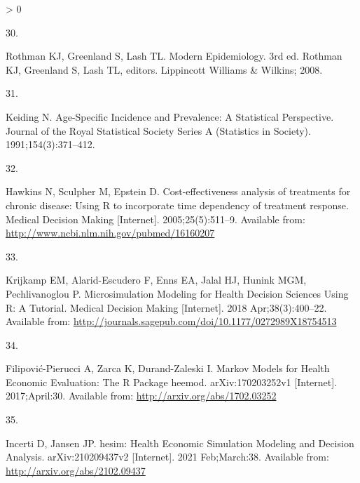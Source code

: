 \documentclass[
]{article}
\newlength{\cslhangindent}
\newlength{\csllabelwidth}
\newenvironment{CSLReferences}[2] %
 {%
  \setlength{\parindent}{0pt}
  \ifodd #1 \everypar{\setlength{\hangindent}{\cslhangindent}}\ignorespaces\fi
  \ifnum #2 > 0
  \setlength{\parskip}{#2\baselineskip}
  \fi
 }%
 {}
\newcommand{\CSLLeftMargin}[1]{\parbox[t]{\csllabelwidth}{#1}}
\newcommand{\CSLRightInline}[1]{\parbox[t]{\linewidth - \csllabelwidth}{#1}\break}
\begin{document}
\begin{CSLReferences}{0}{0}
\leavevmode\hypertarget{ref-Rothman2008h}{}%
\CSLLeftMargin{30. }
\CSLRightInline{Rothman KJ, Greenland S, Lash TL. {Modern Epidemiology}. 3rd ed. Rothman KJ, Greenland S, Lash TL, editors. Lippincott Williams {\&} Wilkins; 2008. }

\leavevmode\hypertarget{ref-Keiding1991}{}%
\CSLLeftMargin{31. }
\CSLRightInline{Keiding N. {Age-Specific Incidence and Prevalence: A Statistical Perspective}. Journal of the Royal Statistical Society Series A (Statistics in Society). 1991;154(3):371--412. }

\leavevmode\hypertarget{ref-Hawkins2005}{}%
\CSLLeftMargin{32. }
\CSLRightInline{Hawkins N, Sculpher M, Epstein D. {Cost-effectiveness analysis of treatments for chronic disease: Using R to incorporate time dependency of treatment response.} Medical Decision Making {[}Internet{]}. 2005;25(5):511--9. Available from: \url{http://www.ncbi.nlm.nih.gov/pubmed/16160207}}

\leavevmode\hypertarget{ref-Krijkamp2018}{}%
\CSLLeftMargin{33. }
\CSLRightInline{Krijkamp EM, Alarid-Escudero F, Enns EA, Jalal HJ, Hunink MGM, Pechlivanoglou P. {Microsimulation Modeling for Health Decision Sciences Using R: A Tutorial}. Medical Decision Making {[}Internet{]}. 2018 Apr;38(3):400--22. Available from: \url{http://journals.sagepub.com/doi/10.1177/0272989X18754513}}

\leavevmode\hypertarget{ref-Filipovic-Pierucci2017}{}%
\CSLLeftMargin{34. }
\CSLRightInline{Filipović-Pierucci A, Zarca K, Durand-Zaleski I. {Markov Models for Health Economic Evaluation: The R Package heemod}. arXiv:170203252v1 {[}Internet{]}. 2017;April:30. Available from: \url{http://arxiv.org/abs/1702.03252}}

\leavevmode\hypertarget{ref-Incerti2021}{}%
\CSLLeftMargin{35. }
\CSLRightInline{Incerti D, Jansen JP. {hesim: Health Economic Simulation Modeling and Decision Analysis}. arXiv:210209437v2 {[}Internet{]}. 2021 Feb;March:38. Available from: \url{http://arxiv.org/abs/2102.09437}}

\end{CSLReferences}
\end{document}
